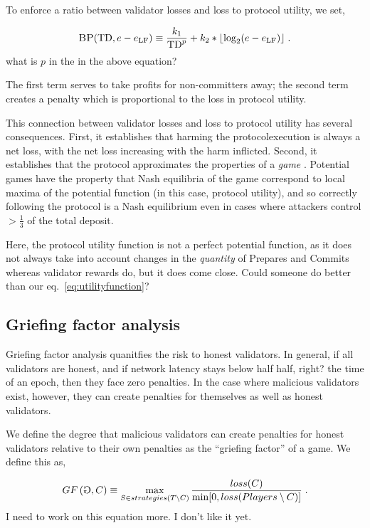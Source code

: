 \documentclass[12pt, final]{article}
\newcommand*{\todo}[1]{\color{red} #1}
\newcommand{\eqref}[1]{eq.~\ref{#1}}
\newcommand{\epoch}{\ensuremath{e}\space}
\newcommand{\totaldeposit}{\textnormal{TD}\space}
\newcommand{\gamesymbol}{\reflectbox{G}}
\newcommand{\epochLF}{\ensuremath{\epoch_{\textnormal{LF}}}\space}
\newcommand{\GF}[1]{GF\left( #1 \right)\space}
\newcommand{\BP}{\textsc{BP}\space}
\begin{document}
To enforce a ratio between validator losses and loss to protocol utility, we set,

\begin{equation}
\BP(\totaldeposit, \epoch - \epochLF) \equiv \frac{k_1}{\totaldeposit^p} + k_2 * \lfloor \log_2(\epoch - \epochLF) \rfloor\; .
\end{equation}
\todo{what is $p$ in the in the above equation?}

The first term serves to take profits for non-committers away; the second term creates a penalty which is proportional to the loss in protocol utility.

This connection between validator losses and loss to protocol utility has several consequences. First, it establishes that harming the protocolexecution is always a net loss, with the net loss increasing with the harm inflicted. Second, it establishes that the protocol approximates the properties of a \emph{game} \cite{monderer1996potential}. Potential games have the property that Nash equilibria of the game correspond to local maxima of the potential function (in this case, protocol utility), and so correctly following the protocol is a Nash equilibrium even in cases where attackers control $>\frac{1}{3}$ of the total deposit.

Here, the protocol utility function is not a perfect potential function, as it does not always take into account changes in the \emph{quantity} of Prepares and Commits whereas validator rewards do, but it does come close. \todo{Could someone do better than our \eqref{eq:utilityfunction}?}

\subsection{Griefing factor analysis}
\label{sect:griefingfactor}
Griefing factor analysis quanitfies the risk to honest validators. In general, if all validators are honest, and if network latency stays below half \todo{half, right?} the time of an epoch, then they face zero penalties.  In the case where malicious validators exist, however, they can create penalties for themselves as well as honest validators.

We define the degree that malicious validators can create penalties for honest validators relative to their own penalties as the ``griefing factor'' of a game.  We define this as,

\begin{equation}
\GF{ \gamesymbol,C } \equiv \max_{S \in strategies(T \setminus C)} \frac{loss(C) }{\min[ 0, loss(Players \setminus C) ] } \; .
\end{equation}
\todo{I need to work on this equation more.  I don't like it yet.}
\end{document}
